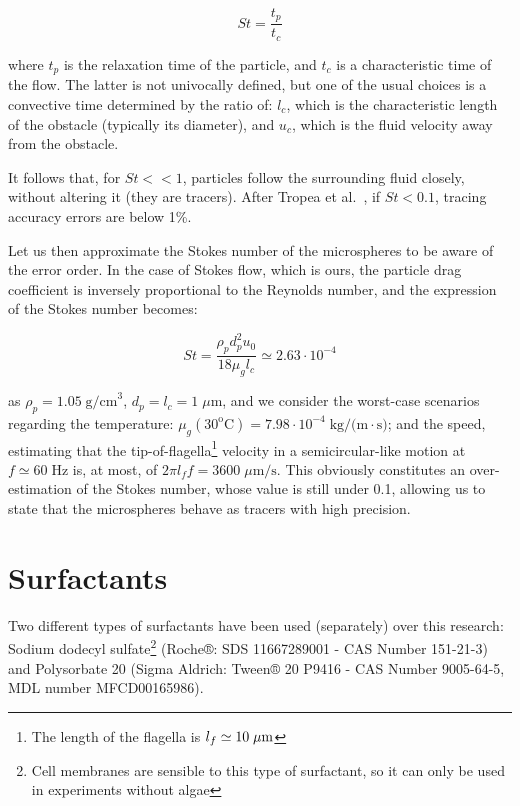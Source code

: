 \begin{equation}
St = \frac{t_p}{t_c}
\end{equation}

where $t_p$ is the relaxation time of the particle, and $t_c$ is a characteristic time of the flow. The latter is not univocally defined, but one of the usual choices is a convective time determined by the ratio of: $l_c$, which is the characteristic length of the obstacle (typically its diameter), and $u_c$, which is the fluid velocity away from the obstacle.

It follows that, for $St << 1$, particles follow the surrounding fluid closely, without altering it (they are tracers). After Tropea et al.~\cite{Tropea}, if  $St < 0.1$, tracing accuracy errors are below 1\%.

Let us then approximate the Stokes number of the microspheres to be aware of the error order. In the case of Stokes flow, which is ours, the particle drag coefficient is inversely proportional to the Reynolds number, and the expression of the Stokes number becomes:

\begin{equation}
	St = \frac{\rho_p d_p^2 u_0}{18 \mu_g l_c} \simeq 2.63 \cdot 10^{-4}
\end{equation}

as $\rho_p = 1.05 \; \textrm{g/cm}^\textrm{3}$, $d_p = l_c = 1 \; \mu \textrm{m}$, and we consider the worst-case scenarios regarding the temperature: $\mu_g(30^\textrm{o} \textrm{C}) = 7.98 \cdot 10^{-4} \; \textrm{kg/(m} \cdot \textrm{s)}$; and the speed, estimating that the tip-of-flagella\footnote{The length of the flagella is $l_f \simeq 10 \; \mu \textrm m $} velocity in a semicircular-like motion at $ f \simeq 60 \; \textrm{Hz}$ is, at most, of $ 2 \pi l_f f = 3600 \; \mu \textrm{m/s}$. This obviously constitutes an over-estimation of the Stokes number, whose value is still under 0.1, allowing us to state that the microspheres behave as tracers with high precision.

\section{Surfactants}

Two different types of surfactants have been used (separately) over this research: Sodium dodecyl sulfate\footnote{Cell membranes are sensible to this type of surfactant, so it can only be used in experiments without algae} (Roche®: SDS 11667289001 - CAS Number 151-21-3) and Polysorbate 20 (Sigma Aldrich: Tween® 20 P9416 - CAS Number 9005-64-5, MDL number MFCD00165986).
 
